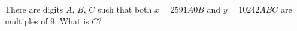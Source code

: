 There are digits $A$, $B$, $C$ such that both $x=\overline{2591A0B}$ and $y=\overline{10242ABC}$ are multiples of $9$. What is $C$?
